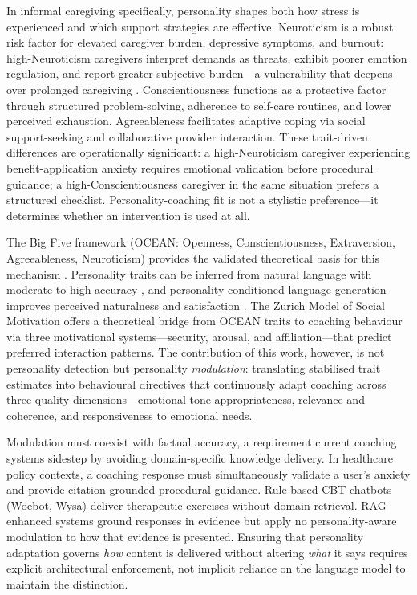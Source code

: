 \documentclass[10pt,a4paper]{report}
\begin{document}
In informal caregiving specifically, personality shapes both how stress is experienced and which support strategies are effective. Neuroticism is a robust risk factor for elevated caregiver burden, depressive symptoms, and burnout: high-Neuroticism caregivers interpret demands as threats, exhibit poorer emotion regulation, and report greater subjective burden---a vulnerability that deepens over prolonged caregiving \citep{Penley2002, Brodaty2009}. Conscientiousness functions as a protective factor through structured problem-solving, adherence to self-care routines, and lower perceived exhaustion. Agreeableness facilitates adaptive coping via social support-seeking and collaborative provider interaction. These trait-driven differences are operationally significant: a high-Neuroticism caregiver experiencing benefit-application anxiety requires emotional validation before procedural guidance; a high-Conscientiousness caregiver in the same situation prefers a structured checklist. Personality-coaching fit is not a stylistic preference---it determines whether an intervention is used at all.

The Big Five framework (OCEAN: Openness, Conscientiousness, Extraversion, Agreeableness, Neuroticism) provides the validated theoretical basis for this mechanism \citep{Costa1992, McCrae1992}. Personality traits can be inferred from natural language with moderate to high accuracy \citep{Yarkoni2010, Park2015}, and personality-conditioned language generation improves perceived naturalness and satisfaction \citep{Mairesse2010, Devdas2025}. The Zurich Model of Social Motivation \citep{Quirin2022, Quirin2023} offers a theoretical bridge from OCEAN traits to coaching behaviour via three motivational systems---security, arousal, and affiliation---that predict preferred interaction patterns. The contribution of this work, however, is not personality detection but personality \emph{modulation}: translating stabilised trait estimates into behavioural directives that continuously adapt coaching across three quality dimensions---emotional tone appropriateness, relevance and coherence, and responsiveness to emotional needs.

Modulation must coexist with factual accuracy, a requirement current coaching systems sidestep by avoiding domain-specific knowledge delivery. In healthcare policy contexts, a coaching response must simultaneously validate a user's anxiety and provide citation-grounded procedural guidance. Rule-based CBT chatbots (Woebot, Wysa) deliver therapeutic exercises without domain retrieval. RAG-enhanced systems ground responses in evidence but apply no personality-aware modulation to how that evidence is presented. Ensuring that personality adaptation governs \emph{how} content is delivered without altering \emph{what} it says requires explicit architectural enforcement, not implicit reliance on the language model to maintain the distinction.
\end{document}
